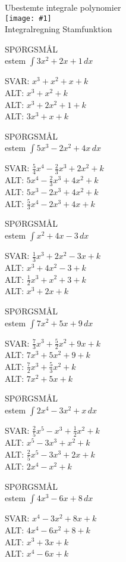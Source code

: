 \documentclass[]{article}
\newcounter{spgcounter}
\newenvironment{question}[2]{\addtocounter{spgcounter}{1} SPØRGSMÅL \thespgcounter\\}{\hspace{50px}}
\newcommand{\name}[1]{{\huge #1}\\}
\newcommand{\tag}[1]{#1}
\newcommand{\cover}[1]{\texttt{[image: \#1]}\\}
\newcommand{\answer}[1]{{\color{green} SVAR: #1}\\}
\newcommand{\alt}[1]{{\color{red} ALT: #1}\\}
\begin{document}
\name{Ubestemte integrale polynomier}
\cover{integralepolynomier.png}
\tag{Integralregning}
\tag{Stamfunktion}

\begin{question}{multi}

Bestem $\int{3x^2+2x+1}\, dx$

\answer{$x^3 + x^2 + x + k$}
\alt{$x^3 + x^2 + k$}
\alt{$x^3 + 2x^2 + 1 + k$}
\alt{$3x^3 + x + k$}

\end{question}

\begin{question}{multi}

Bestem $\int{5x^3 - 2x^2 + 4x}\, dx$

\answer{$\frac{5}{4}x^4 - \frac{2}{3}x^3 + 2x^2 + k$}
\alt{$5x^4 - \frac{2}{3}x^3 + 4x^2 + k$}
\alt{$5x^3 - 2x^3 + 4x^2 + k$}
\alt{$\frac{5}{3}x^4 - 2x^3 + 4x + k$}

\end{question}

\begin{question}{multi}

Bestem $\int{x^2 + 4x - 3}\, dx$

\answer{$\frac{1}{3}x^3 + 2x^2 - 3x + k$}
\alt{$x^3 + 4x^2 - 3 + k$}
\alt{$\frac{1}{2}x^3 + x^2 + 3 + k$}
\alt{$x^3 + 2x + k$}

\end{question}

\begin{question}{multi}

Bestem $\int{7x^2 + 5x + 9}\, dx$

\answer{$\frac{7}{3}x^3 + \frac{5}{2}x^2 + 9x + k$}
\alt{$7x^3 + 5x^2 + 9 + k$}
\alt{$\frac{7}{2}x^3 + \frac{5}{3}x^2 + k$}
\alt{$7x^2 + 5x + k$}

\end{question}

\begin{question}{multi}

Bestem $\int{2x^4 - 3x^2 + x}\, dx$

\answer{$\frac{2}{5}x^5 - x^3 + \frac{1}{2}x^2 + k$}
\alt{$x^5 - 3x^3 + x^2 + k$}
\alt{$\frac{2}{5}x^5 - 3x^3 + 2x + k$}
\alt{$2x^4 - x^2 + k$}

\end{question}

\begin{question}{multi}

Bestem $\int{4x^3 - 6x + 8}\, dx$

\answer{$x^4 - 3x^2 + 8x + k$}
\alt{$4x^4 - 6x^2 + 8 + k$}
\alt{$x^3 + 3x + k$}
\alt{$x^4 - 6x + k$}

\end{question}
\end{document}
